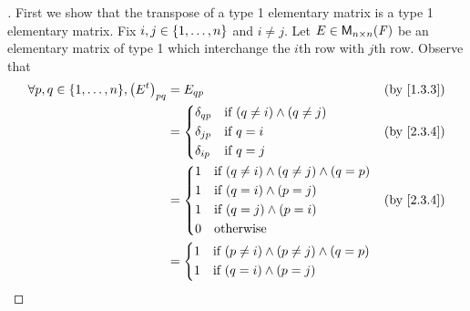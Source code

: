 \begin{proof}[]
  First we show that the transpose of a type 1 elementary matrix is a type 1 elementary matrix.
  Fix \(i, j \in \left\lbrace1, \dots, n\right\rbrace\) and \(i \neq j\).
  Let \(E \in \ms[n][n][\F]\) be an elementary matrix of type 1 which interchange the \(i\)th row with \(j\)th row.
  Observe that
  \begin{align*}
    \forall p, q \in \set{1, \dots, n}, \pa{\tp{E}}_{p q} & = E_{q p}                                                   &  & \by{1.3.3} \\
                                                          & = \begin{dcases}
                                                                \delta_{q p} & \text{if } (q \neq i) \land (q \neq j) \\
                                                                \delta_{j p} & \text{if } q = i                       \\
                                                                \delta_{i p} & \text{if } q = j
                                                              \end{dcases}    &  & \by{2.3.4}                     \\
                                                          & = \begin{dcases}
                                                                1 & \text{if } (q \neq i) \land (q \neq j) \land (q = p) \\
                                                                1 & \text{if } (q = i) \land (p = j)                     \\
                                                                1 & \text{if } (q = j) \land (p = i)                     \\
                                                                0 & \text{otherwise}
                                                              \end{dcases} &  & \by{2.3.4}                  \\
                                                          & = \begin{dcases}
                                                                1 & \text{if } (p \neq i) \land (p \neq j) \land (q = p) \\
                                                                1 & \text{if } (q = i) \land (p = j)                     \\

\end{dcases}
\end{align*}
\end{proof}
